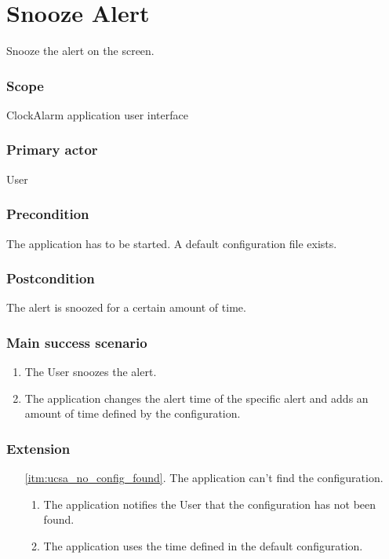 \section{Snooze Alert}\label{subsec:usecase_snooze_alert}
Snooze the alert on the screen.
\subsubsection{Scope}
ClockAlarm application user interface
\subsubsection{Primary actor}
User
\subsubsection{Precondition}
The application has to be started. A default configuration file exists.
\subsubsection{Postcondition}
The alert is snoozed for a certain amount of time.
\subsubsection{Main success scenario}
\begin{enumerate}
    \item The User snoozes the alert.
    \item\label{itm:ucsa_no_config_found} The application changes the alert 
        time of the specific alert and adds an amount of time defined by the
        configuration.
\end{enumerate}
\subsubsection{Extension}
\begin{enumerate}
	\item[\ref{itm:ucsa_no_config_found}.] The application can't find the 
        configuration.
		\begin{enumerate}[i]
			\item The application notifies the User that the configuration
                has not been found.
			\item The application uses the time defined in the default 
                configuration.
		\end{enumerate}
\end{enumerate}
